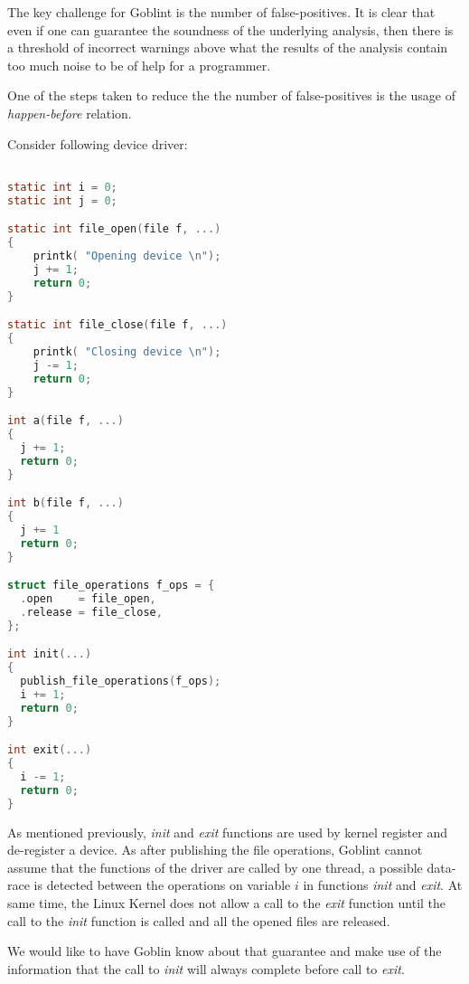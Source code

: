 \documentclass[..thesis.tex]{subfiles}
\begin{document}

The key challenge for Goblint is the number of false-positives. It is clear that even if one can guarantee the soundness of the 
underlying analysis, then there is a threshold of incorrect warnings above what the results of the analysis contain too much noise
to be of help for a programmer.


One of the steps taken to reduce the the number of false-positives is the usage of \textit{happen-before} relation.


Consider following device driver:

\begin{lstlisting}[language=c,style=def]

static int i = 0;
static int j = 0;

static int file_open(file f, ...)
{
    printk( "Opening device \n");
    j += 1;
    return 0;
}

static int file_close(file f, ...)
{
    printk( "Closing device \n");
    j -= 1;
    return 0;
}

int a(file f, ...)
{
  j += 1;
  return 0;
}

int b(file f, ...)
{
  j += 1
  return 0;
}

struct file_operations f_ops = {
  .open    = file_open,
  .release = file_close,
};

int init(...)
{
  publish_file_operations(f_ops);
  i += 1;
  return 0;
}

int exit(...)
{
  i -= 1;
  return 0;
}

\end{lstlisting}

As mentioned previously, \textit{init} and \textit{exit} functions are used by kernel register and de-register a device. As after publishing the file operations, Goblint cannot assume that the functions of the driver are called by one thread, a possible data-race is detected between the operations on variable $i$ in functions \textit{init} and \textit{exit}. At same time, the Linux Kernel does not allow a call to the \textit{exit} function until the call to the \textit{init} function is called and all the opened files are released.

We would like to have Goblin know about that guarantee and make use of the information that the call to \textit{init} will always complete before call to \textit{exit}.
\end{document}

